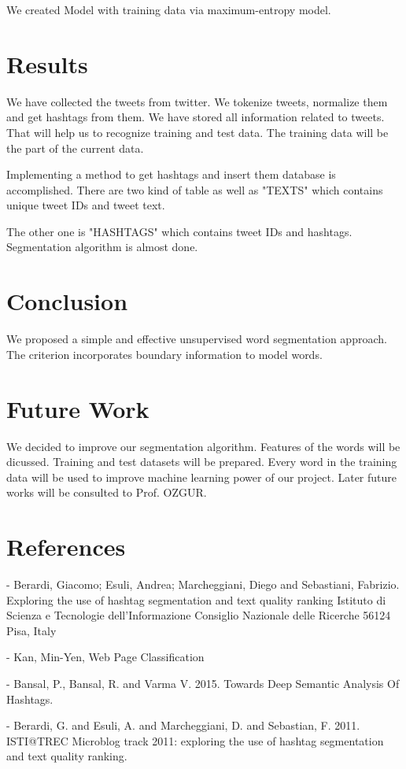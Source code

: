 \documentclass[12pt]{comjnl}
\begin{document}
 We created Model with training data via maximum-entropy model.

\section{Results}
We have collected the tweets from twitter. We tokenize tweets, normalize them and get 
hashtags from them. We have stored all information related to tweets. That will help us to recognize training and test data. The training data will be the part of the current data.

Implementing a method to get hashtags and insert them database is 
accomplished. There are two kind of table as well as "TEXTS" which contains unique tweet IDs
and tweet text.

The other one is "HASHTAGS" which contains tweet IDs and hashtags. Segmentation algorithm
is almost done.

\section{Conclusion}
We proposed a simple and effective unsupervised
word segmentation approach. The criterion incorporates
boundary information to model words.

\section{Future Work}
We decided to improve our segmentation algorithm. Features of the words will be dicussed. Training and test
datasets will be prepared. Every word in the training data will be used to improve machine
learning power of our project. Later future works will be consulted to Prof. OZGUR.

\section{References}
- Berardi, Giacomo; Esuli, Andrea; Marcheggiani, Diego and Sebastiani, Fabrizio. Exploring the use of hashtag segmentation and text quality ranking 
Istituto di Scienza e Tecnologie dell’Informazione Consiglio Nazionale delle Ricerche 56124 Pisa, Italy

- Kan, Min-Yen, Web Page Classification

- Bansal, P., Bansal, R. and Varma V. 2015. Towards
Deep Semantic Analysis Of Hashtags.

- Berardi, G. and Esuli, A. and Marcheggiani, D. and
Sebastian, F. 2011. ISTI@TREC Microblog track
2011: exploring the use of hashtag segmentation
and text quality ranking.
\end{document}
